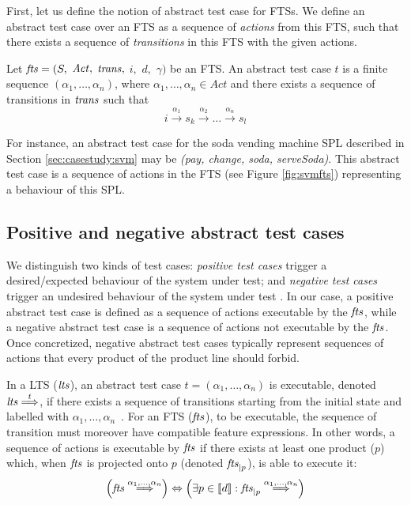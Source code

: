 First, let us define the notion of abstract test case for FTSs. We define an abstract test case over an FTS as a sequence of \emph{actions} from this FTS, such that there exists a sequence of \emph{transitions} in this FTS with the given actions.
%
\begin{definition} \label{def:atc}
Let $\mathit{fts} = (S,$ $\mathit{Act},$ $\mathit{trans},$ $i,$ $d,$ $\gamma)$ be an FTS. An abstract test case $t$ is a finite sequence $(\alpha_1,\ldots, \alpha_n)$, where $\alpha_1,\ldots, \alpha_n \in Act$ and there exists a sequence of transitions in $\mathit{trans}$ such that 
$$i \xrightarrow{\alpha_1} s_k \xrightarrow{\alpha_2} \ldots \xrightarrow{\alpha_n} s_l $$
\end{definition} 
%

For instance, an abstract test case for the \gls{soda vending machine} SPL described in Section \ref{sec:casestudy:svm} may be \textit{(pay, change, soda, serve\-Soda)}. This abstract test case is a sequence of actions in the FTS (see Figure \ref{fig:svmfts}) representing a behaviour of this SPL.

\subsection{Positive and negative abstract test cases}

We distinguish two kinds of test cases: \emph{positive test cases} trigger a desired/expected behaviour of the system under test; and \emph{negative test cases} trigger an undesired behaviour of the system under test \cite{Jobstl2014,Utting2007}. In our case, a \gls{positive abstract test case} is defined as a sequence of actions executable by the $\mathit{fts}$, while a \gls{negative abstract test case} is a sequence of actions not executable by the $\mathit{fts}$. Once concretized, negative abstract test cases typically represent sequences of actions that every product of the product line should forbid. 

In a LTS ($\mathit{lts}$), an abstract test case $t=(\alpha_1,\ldots, \alpha_n)$ is executable, denoted $\mathit{lts} \overset{t}{\Longrightarrow}$, if there exists a sequence of transitions starting from the initial state and labelled with $\alpha_1,\ldots, \alpha_n$~\cite{Tretmans2008,Tretmans2011}. For an FTS ($\mathit{fts}$), to be executable, the sequence of transition must moreover have compatible feature expressions. In other words, a sequence of actions is executable by $\mathit{fts}$ if there exists at least one product ($p$) which, when $\mathit{fts}$ is projected onto $p$ (denoted $\mathit{fts}_{\mid p}$), is able to execute it:
%
$$ 
\left( \mathit{fts} \overset{\alpha_1,\ldots, \alpha_n}{\Longrightarrow} \right) 
\Leftrightarrow 
\left(\exists p \in [\![ d]\!] : \mathit{fts}_{\mid p} \overset{\alpha_1,\ldots, \alpha_n}{\Longrightarrow} \right) 
$$
%

